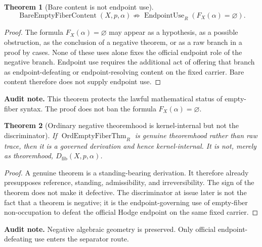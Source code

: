 \documentclass[11pt]{article}
\newtheorem{theorem}{Theorem}[section]
\newcommand{\EndpointUse}{\operatorname{EndpointUse}}
\begin{document}
\begin{theorem}[Bare content is not endpoint use]
\[
\operatorname{BareEmptyFiberContent}(X,p,\alpha)\not\Rightarrow \EndpointUse_R(F_X(\alpha)=\varnothing).
\]
\end{theorem}
\begin{proof}
The formula $F_X(\alpha)=\varnothing$ may appear as a hypothesis, as a possible obstruction, as the conclusion of a negative theorem, or as a raw branch in a proof by cases.  None of these uses alone fixes the official endpoint role of the negative branch.  Endpoint use requires the additional act of offering that branch as endpoint-defeating or endpoint-resolving content on the fixed carrier.  Bare content therefore does not supply endpoint use.
\end{proof}
\par\noindent\textbf{Audit note.} This theorem protects the lawful mathematical status of empty-fiber syntax.  The proof does not ban the formula $F_X(\alpha)=\varnothing$.

\begin{theorem}[Ordinary negative theoremhood is kernel-internal but not the discriminator]
If $\operatorname{OrdEmptyFiberThm}_R$ is genuine theoremhood rather than raw trace, then it is a governed derivation and hence kernel-internal.  It is not, merely as theoremhood, $D_{\mathrm{fib}}(X,p,\alpha)$.
\end{theorem}
\begin{proof}
A genuine theorem is a standing-bearing derivation.  It therefore already presupposes reference, standing, admissibility, and irreversibility.  The sign of the theorem does not make it defective.  The discriminator at issue later is not the fact that a theorem is negative; it is the endpoint-governing use of empty-fiber non-occupation to defeat the official Hodge endpoint on the same fixed carrier.
\end{proof}
\par\noindent\textbf{Audit note.} Negative algebraic geometry is preserved.  Only official endpoint-defeating use enters the separator route.
\end{document}

